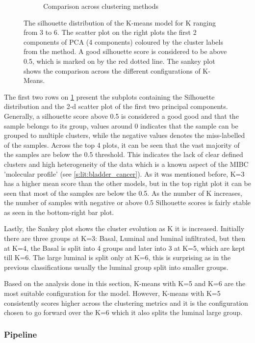 \begin{figure}[!t]
\begin{subfigure}[!t]{0.49\textwidth}
        \caption{Comparison across clustering methods}
    \end{subfigure}
    \centering
    \caption{The silhouette distribution of the K-means model for K ranging from 3 to 6. The scatter plot on the right plots the first 2 components of PCA (4 components) coloured by the cluster labels from the method. A good silhouette score is considered to be above 0.5, which is marked on by the red dotted line. The sankey plot shows the comparison across the different configurations of K-Means.}
    \label{fig:cs:sill_distrib}
\end{figure}


The first two rows on \cref{fig:cs:sill_distrib} present the subplots containing the Silhouette distribution and the 2-d scatter plot of the first two principal components. Generally, a silhouette score above 0.5 is considered a good good and that the sample belongs to its group, values around 0 indicates that the sample can be grouped to multiple clusters, while the negative values denotes the miss-labelled of the samples. Across the top 4 plots, it can be seen that the vast majority of the samples are below the 0.5 threshold. This indicates the lack of clear defined clusters and high heterogeneity of the data which is a known aspect of the MIBC 'molecular profile' (see \cref{s:lit:bladder_cancer}). As it was mentioned before, K=3 has a higher mean score than the other models, but in the top right plot it can be seen that most of the samples are below the 0.5. As the number of K increases, the number of samples with negative or above 0.5 Silhouette scores is fairly stable as seen in the bottom-right bar plot. 

Lastly, the Sankey plot shows the cluster evolution as K it is increased. Initially there are three groups at K=3: Basal, Luminal and luminal infiltrated, but then at K=4, the Basal is split into 4 groups and later into 3 at K=5, which are kept till K=6. The large luminal is split only at K=6, this is surprising as in the previous classifications usually the luminal group split into smaller groups.

Based on the analysis done in this section, K-means with K=5 and K=6 are the most suitable configuration for the model. However, K-means with K=5 consistently scores higher across the clustering metrics and it is the configuration chosen to go forward over the K=6 which it also splits the luminal large group.

\subsubsection{Pipeline}


